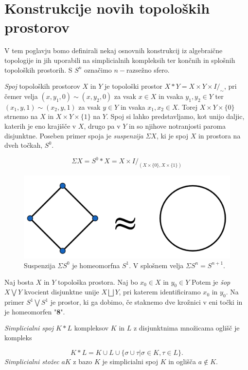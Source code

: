\documentclass[mat1]{fmfdelo}
\begin{document}
\section{Konstrukcije novih topoloških prostorov}


V tem poglavju bomo definirali nekaj osnovnih konstrukcij iz algebraične topologije in jih uporabili na simplicialnih kompleksih ter končnih in splošnih topoloških prostorih. S $S^n$ označimo $n-$razsežno sfero.

\emph{Spoj} topoloških prostorov $X$ in $Y$ je topološki prostor $X\ast Y = X\times Y 
\times I /_{\sim}$, pri čemer velja $(x, y_1, 0) \sim (x, y_2, 0)$ za vsak $x\in X$ in vsaka $y_1,y_2 \in Y$ ter  $(x_1, y, 1) \sim (x_2, y, 1)$ za vsak $y\in Y$ in vsaka $x_1, x_2 \in X$.
Torej $X\times Y\times \{0\}$ strnemo na $X$ in $X\times Y\times \{1\}$ na $Y$. Spoj si lahko predstavljamo, kot unijo daljic, katerih je eno krajišče v $X$, drugo pa v $Y$ in so njihove notranjosti paroma disjunktne.
Poseben primer spoja je \emph{suspenzija} $\Sigma X$, ki je spoj $X$ in prostora na dveh točkah, $S^0$.

$$
\Sigma X=S^0\ast X = X\times I /_{(X\times \{0\},X\times \{1\})}
$$

\begin{figure}[h]
    \centering
    \includegraphics[width=0.6\linewidth]{homeo2.png}
    \caption{Suspenzija $\Sigma S^0$ je homeomorfna $S^1$. V splošnem velja $\Sigma S^n=S^{n+1}$.}
\end{figure}

Naj bosta $X$ in $Y$ topološka prostora. Naj bo $x_0\in X$ in $y_0\in Y$ Potem je 
\emph{šop} $X\bigvee Y$ kvocient disjunktne unije $X\bigsqcup Y$, pri
 katerem identificiramo $x_0$ in $y_0$. Na primer $S^1\bigvee S^1$ je prostor,
  ki ga dobimo, če staknemo dve krožnici v eni točki in je homeomorfen "\textbf{8}".


\emph{Simplicialni spoj $K\ast L$} kompleksov $K$ in $L$ z disjunktnima množicama oglišč je kompleks

$$
K\ast L=K\cup L \cup \{\sigma \cup \tau| \sigma \in K, \tau \in L \}.
$$
\emph{Simplicialni stožec} $aK$ z bazo $K$ je simplicialni spoj $K$ in oglišča $a\notin K$.
\end{document}
